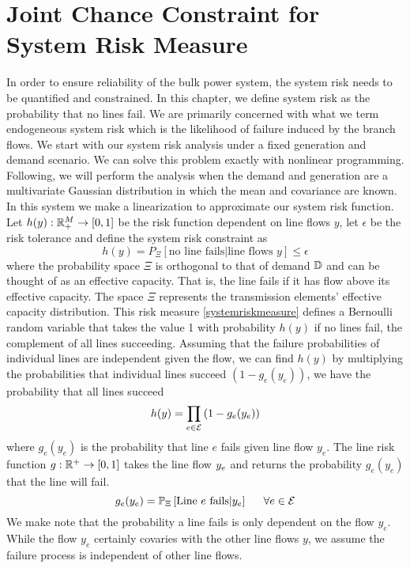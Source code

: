 \section{Joint Chance Constraint for System Risk Measure} \label{jointchanceconstraint}
In order to ensure reliability of the bulk power system, the system risk needs to be quantified and constrained. In this chapter, we define system risk as the probability that no lines fail.  We are primarily concerned with what we term endogeneous system risk which is the likelihood of failure induced by the branch flows.  We start with our system risk analysis under a fixed generation and demand scenario.  We can solve this problem exactly with nonlinear programming.  Following, we will perform the analysis when the demand and generation are a multivariate Gaussian distribution in which the mean and covariance are known.  In this system we make a linearization to approximate our system risk function.   Let $h(y) : \mathbb{R}^{M}_+ \rightarrow \left[ 0, 1 \right]$ be the risk function dependent on line flows $y$, let $\epsilon$ be the risk tolerance and define the system risk constraint as
\begin{equation}\label{systemriskmeasure}
h(y) = P_\Xi \left[ \mbox{no line fails} | \mbox{line flows } y\right] \leq \epsilon
\end{equation}
where the probability space $\Xi$ is orthogonal to that of demand $\mathbb{D}$ and can be thought of as an effective capacity.  That is, the line fails if it has flow above its effective capacity.  The space $\Xi$ represents the transmission elements' effective capacity distribution.  
This risk measure \cref{systemriskmeasure} defines a Bernoulli random variable that takes the value 1 with probability $h(y)$ if no lines fail, the complement of all lines succeeding.  Assuming that the failure probabilities of individual lines are independent given the flow, we can find $h(y)$ by multiplying the probabilities that individual lines succeed $(1-g_e(y_e))$, we have the probability that all lines succeed
\begin{equation}  \label{nofail}
h(y) = \prod_{e \in \mathcal{E}} \left( 1 - g_e(y_e) \right)
\end{equation}  
where $g_e(y_e)$ is the probability that line $e$ fails given line flow $y_e$.   The line risk function $g : \mathbb{R}^{+} \rightarrow [0,1]$ takes the line flow $y_e$ and returns the probability $g_e(y_e)$ that the line will fail.   
\begin{equation}
 g_e(\hy_e) = \bP{\Xi}{\text{Line }e\text{ fails} | \hy_e}  \hspace{15px} \forall e \in \cE
\end{equation}
We make note that the probability a line fails is only dependent on the flow $y_e$.  While the flow $y_e$ certainly covaries with the other line flows $y$, we assume the failure process is independent of other line flows.

